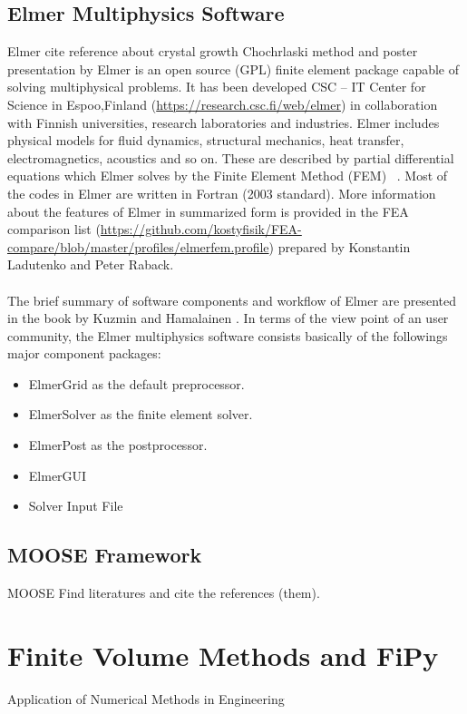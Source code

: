 \subsection{Elmer Multiphysics Software}
Elmer cite reference about crystal growth Chochrlaski method \cite{VSavolainen2002} and poster presentation by 
\cite{PRaback2007}
Elmer is  an open source (GPL) finite element package capable of solving  multiphysical problems. It has been developed CSC – IT Center for Science in Espoo,Finland  (\url{https://research.csc.fi/web/elmer}) in collaboration with Finnish universities, research laboratories and industries. Elmer includes physical models for fluid dynamics, structural mechanics, heat transfer, electromagnetics, acoustics and so on. These are described by partial differential equations which Elmer solves by the Finite Element Method (FEM)~\cite{VSavolainen2002}\cite{PRaback2007}\cite{EJarvinen2008}
\cite{TSikanen2008}\cite{SAdhikari2012}\cite{HSeddik2012}. 
Most of the codes in Elmer are written in Fortran (2003 standard). More information about the features of Elmer in summarized form is provided in the FEA comparison list (\url{https://github.com/kostyfisik/FEA-compare/blob/master/profiles/elmerfem.profile}) prepared by Konstantin Ladutenko and Peter Raback.  
\paragraph*{}
The brief summary of software components and workflow of Elmer are presented in the book by Kuzmin and Hamalainen \cite{DKuzmin2014}.
In terms of the view point of an user community, the Elmer multiphysics software consists basically of the followings major component packages:
\begin{itemize}
\item ElmerGrid as the default preprocessor.
\item ElmerSolver as the finite element solver.
\item ElmerPost as the postprocessor.
\item ElmerGUI
\item Solver Input File
\end{itemize}


\subsection{MOOSE Framework}
MOOSE 
Find literatures and cite the references (them).
\section{Finite Volume Methods and FiPy} 
Application of Numerical Methods in Engineering
